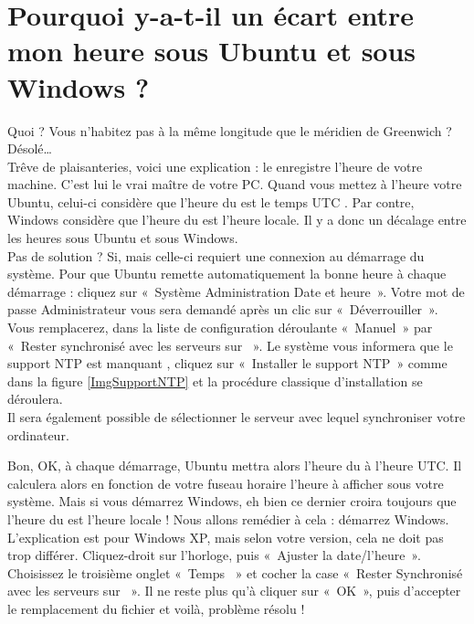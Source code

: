 \section{Pourquoi y-a-t-il un écart entre mon heure sous Ubuntu et sous Windows ?}
\label{RefHeureNTP}
Quoi ? Vous n'habitez pas à la même longitude que le méridien de Greenwich ? Désolé\ldots{}\\
Trêve de plaisanteries, voici une explication : le  enregistre l'heure de votre machine. C'est lui le vrai maître de votre PC. Quand vous mettez à l'heure votre Ubuntu, celui-ci considère que l'heure du  est le temps UTC . Par contre, Windows considère que l'heure du  est l'heure locale. Il y a donc un décalage entre les heures sous Ubuntu et sous Windows.\\Pas de solution ? Si, mais celle-ci requiert une connexion  au démarrage du système. Pour que Ubuntu remette automatiquement la bonne heure à chaque démarrage : cliquez sur «~Système \FlecheDroite Administration \FlecheDroite Date et heure~». Votre mot de passe Administrateur vous sera demandé après un clic sur «~Déverrouiller~». Vous remplacerez, dans la liste de configuration déroulante «~Manuel~» par «~Rester synchronisé avec les serveurs sur ~». Le système vous informera que le support NTP est manquant , cliquez sur «~Installer le support NTP~» comme dans la figure \ref{ImgSupportNTP} et la procédure classique d'installation se déroulera.\\
Il sera également possible de sélectionner le serveur avec lequel synchroniser votre ordinateur.\par
{}
Bon, OK, à chaque démarrage, Ubuntu mettra alors l'heure du  à l'heure UTC. Il calculera alors en fonction de votre fuseau horaire l'heure à afficher sous votre système. Mais si vous démarrez Windows, eh bien ce dernier croira toujours que l'heure du  est l'heure locale ! Nous allons remédier à cela : démarrez Windows. L'explication est pour Windows XP, mais selon votre version, cela ne doit pas trop différer. Cliquez-droit sur l'horloge, puis «~Ajuster la date/l'heure~». Choisissez le troisième onglet «~Temps ~» et cocher la case «~Rester Synchronisé avec les serveurs sur ~». Il ne reste plus qu'à cliquer sur «~OK~», puis d'accepter le remplacement du fichier  et voilà, problème résolu !
